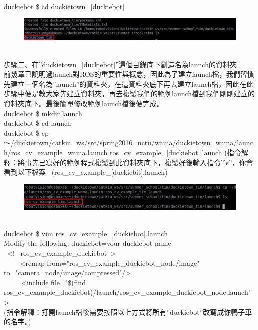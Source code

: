\documentclass{article}
\begin{document}
\\duckiebot \$ cd duckietown\_[duckiebot]
\begin{figure}[htp]
    \begin{center}
        \includegraphics[width=400pt]{pic/5_2_2.png}
    \end{center}
\end{figure}
\\
步驟二、在”duckietown\_[duckiebot]”這個目錄底下創造名為launch的資料夾
\\前幾章已說明過launch對ROS的重要性與概念，因此為了建立launch檔，我們習慣先建立一個名為”launch”的資料夾，在這資料夾底下再去建立launch檔，因此在此步驟中便是教大家先建立資料夾，再去複製我們的範例launch檔到我們剛剛建立的資料夾底下。最後簡單修改範例launch檔後便完成。
\\duckiebot \$ mkdir launch
\\duckiebot \$ cd launch
\\duckiebot \$ cp ～/duckietown/catkin\_ws/src/spring2016\_nctu/wama/duckietown\_wama/launch/ros\_cv\_example\_wama.launch ros\_cv\_example\_[duckiebot].launch 
(指令解釋：將事先已寫好的範例程式複製到此資料夾底下，複製好後輸入指令”ls”，你會看到以下檔案  (ros\_cv\_example\_[duckiebit].launch)
\begin{figure}[htp]
    \begin{center}
        \includegraphics[width=400pt]{pic/5_2_3.png}
    \end{center}
\end{figure}
\\
duckiebot \$ vim ros\_cv\_example\_[duckiebot].launch
\\Modify the following: duckiebot=your duckiebot name
\\ <!-- ros\_cv\_example\_duckiebot-->
\\     <remap from="ros\_cv\_example\_duckiebot\_node/image" to="camera\_node/image/compressed"/>
\\     <include file="\$(find ros\_cv\_example\_duckiebot)/launch/ros\_cv\_example\_duckiebot\_node.launch">
\\(指令解釋：打開launch檔後需要按照以上方式將所有”duckiebot”改寫成你鴨子車的名字。)
\end{document}

